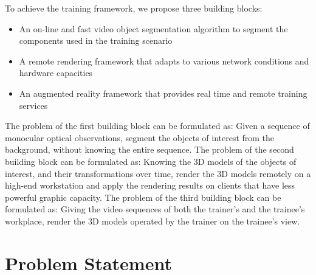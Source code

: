 

To achieve the training framework, we propose three building blocks:

\begin{itemize}
  \item
  An on-line and fast video object segmentation algorithm to segment the components used in the training scenario
  \item
  A remote rendering framework that adapts to various network conditions and hardware capacities
  \item
  An augmented reality framework that provides real time and remote training services
\end{itemize}

The problem of the first building block can be formulated as: Given a sequence of monocular optical observations, segment the objects of interest from the background, without knowing the entire sequence. The problem of the second building block can be formulated as: Knowing the 3D models of the objects of interest, and their transformations over time, render the 3D models remotely on a high-end workstation and apply the rendering results on clients that have less powerful graphic capacity.  The problem of the third building block can be formulated as: Giving the video sequences of both the trainer's and the trainee's workplace, render the 3D models operated by the trainer on the trainee's view.

\section{Problem Statement}

